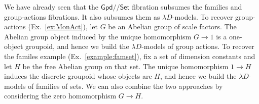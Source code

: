 \documentclass[a4paper,UKenglish]{lipics}
\newcommand\note[1]{{ \bf \textcolor{red} {\vspace{2mm}\; \\ Note: #1\\}}}
\newcommand{\ra}{\rightarrow}
\newcommand{\msf}[1]{\mathsf{#1}} %
\newcommand{\Set}{\msf{Set}}
\newcommand{\Cat}{\msf{Cat}}
\newcommand{\Gpd}{\msf{Gpd}}
\newcommand{\Fib}{\msf{Fib}}
\newcommand{\LAb}{\msf{L}_{\msf{Ab}}}
\newcommand{\terminal}{\msf{1}}
\newcommand{\A}{\mathcal{A}}
\newcommand{\D}{\mathcal{D}}
\newcommand{\E}{\mathcal{E}}
\newcommand{\fibre}[2]{#1_{_{#2}}}
\newcommand{\fibreE}[1]{\E_{#1}}
\newcommand{\blank}{\, \underline{\hspace{2mm}} \,}
\newcommand{\SqFun}[1][\blank]{[\, #1 \, ]} %
\newcommand{\Lslice}[1]{#1/\!/\Set}
\newcommand{\GpdSet}{\Lslice{\Gpd}}
\newcommand{\qnt}{\msf{quantity}}
\begin{document}
\begin{example}
We have already seen that the $\GpdSet$ fibration subsumes the families and
group-actions fibrations. It also subsumes them as $\lambda D$-models.
To recover group-actions (Ex.~\ref{ex:MonAct}),
let $G$ be an Abelian group of scale factors.
The Abelian group object induced by
the unique homomorphism $G\to 1$ is a one-object groupoid,
and hence we build
the $\lambda D$-models of group actions.
To recover the familes example (Ex.~\ref{example:famset}),
fix a set of dimension constants and let $H$ be the
free Abelian group on that set. The unique homomorphism $1\to H$ induces the
discrete groupoid whose objects are $H$, and hence we build the $\lambda D$-%
models of families of sets.
We can also combine the two approaches
by considering the zero homomorphism $G\to H$.
\end{example}




\end{document}
